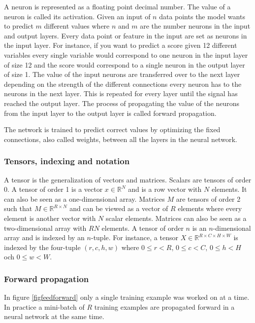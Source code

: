 \documentclass[a4paper,11pt,twoside]{article}
\begin{document}
A neuron is represented as a floating point decimal number. The value of a neuron is called its activation. Given an input of $n$ data points the model wants to predict $m$ different values where $n$ and $m$ are the number neurons in the input and output layers. Every data point or feature in the input are set as neurons in the input layer. For instance, if you want to predict a score given 12 different variables every single variable would correspond to one neuron in the input layer of size 12 and the score would correspond to a single neuron in the output layer of size 1. The value of the input neurons are transferred over to the next layer depending on the strength of the different connections every neuron has to the neurons in the next layer. This is repeated for every layer until the signal has reached the output layer. The process of propagating the value of the neurons from the input layer to the output layer is called forward propagation. \cite{cs231n}

The network is trained to predict correct values by optimizing the fixed connections, also called weights, between all the layers in the neural network. \cite{cs231n}


\subsubsection{Tensors, indexing and notation}
A tensor is the generalization of vectors and matrices. Scalars are tensors of order 0. A tensor of order 1 is a vector $x \in \mathbb{R}^N$ and is a row vector with $N$ elements. It can also be seen as a one-dimensional array. Matrices $M$ are tensors of order 2 such that $M \in \mathbb{R}^{R \times N}$ and can be viewed as a vector of $R$ elements where every element is another vector with $N$ scalar elements. Matrices can also be seen as a two-dimensional array with $RN$ elements. A tensor of order $n$ is an $n$-dimensional array and is indexed by an $n$-tuple. For instance, a tensor $X \in \mathbb{R}^{R \times C \times H \times W}$ is indexed by the four-tuple $(r,c,h,w)$ where $0 \leq r < R$, $0 \leq c < C$, $0 \leq h < H$ och $0 \leq w < W$. \cite{cs231n}

\subsubsection{Forward propagation}
In figure \ref{figfeedforward} only a single training example was worked on at a time. In practice a mini-batch of $R$ training examples are propagated forward in a neural network at the same time. \cite{cs231n} \cite{wikiStanford}
\end{document}

